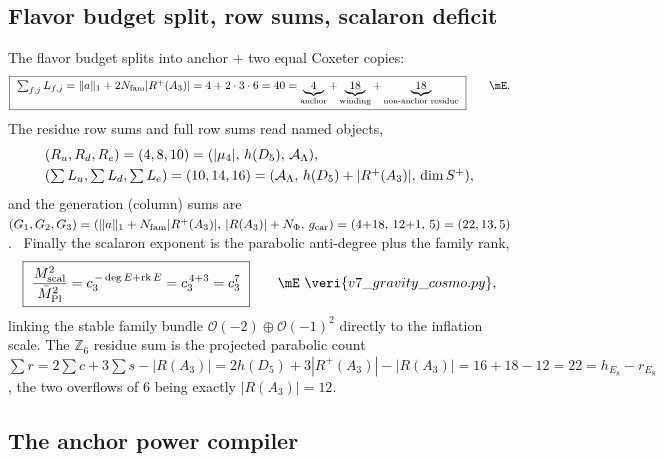 \subsection{Flavor budget split, row sums, scalaron deficit}
The flavor budget splits into anchor $+$ two equal Coxeter copies:
\begin{equation}
  \boxed{\ \textstyle\sum_{f,j}L_{f,j}=\|a\|_1+2\Nfam|R^+(A_3)|=4+2\cdot3\cdot6=40=\underbrace{4}_{\text{anchor}}+\underbrace{18}_{\text{winding}}+\underbrace{18}_{\text{non-anchor residue}}\ }\qquad\mE .
\end{equation}
The residue row sums and full row sums read named objects,
\begin{equation}
\begin{aligned}
  &(R_u,R_d,R_e)=(4,8,10)=(|\mu_4|,\,h(D_5),\,\mathcal A_\Lambda),\\
  &(\textstyle\sum L_u,\sum L_d,\sum L_e)=(10,14,16)=(\mathcal A_\Lambda,\,h(D_5)+|R^+(A_3)|,\,\dim S^+),
\end{aligned}
\end{equation}
and the generation (column) sums are
$(G_1,G_2,G_3)=(\|a\|_1+N_{\mathrm{fam}}|R^+(A_3)|,\,|R(A_3)|+N_\Phi,\,g_{\mathrm{car}})=(4{+}18,\,12{+}1,\,5)=(22,13,5)$. \mE\
Finally the scalaron exponent is the parabolic anti-degree plus the family rank,
\begin{equation}
  \boxed{\ \frac{M_{\mathrm{scal}}^2}{\Mbar^2}=\cthree^{\,-\deg E+\operatorname{rk}E}=\cthree^{\,4+3}=\cthree^7\ }\qquad\mE\ \veri{v7\_gravity\_cosmo.py} ,
\end{equation}
linking the stable family bundle $\mathcal O(-2)\oplus\mathcal O(-1)^2$ directly to the inflation scale.
The $\mathbb Z_6$ residue sum is the projected parabolic count
$\sum r=2\sum c+3\sum s-|R(A_3)|=2h(D_5)+3|R^+(A_3)|-|R(A_3)|=16+18-12=22=h_{E_8}-r_{E_8}$,
the two overflows of $6$ being exactly $|R(A_3)|=12$. \mE

\subsection{The anchor power compiler}

